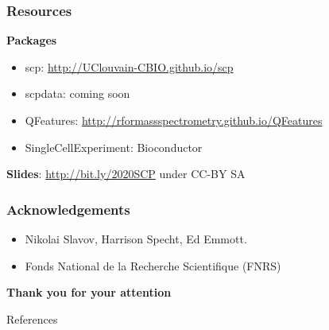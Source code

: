 \documentclass{beamer}
\newcommand{\hcode}[2][lgray]{{\ttfamily\color{vdgray}\colorbox{#1}{#2}}}
\newcommand{\frametitlesection}[1]{\frametitle{\centering #1 \footnotesize \hspace{0pt plus 1 filll} \insertsection}}
\begin{document}
\begin{frame}
    \frametitlesection{Resources}

    \textbf{Packages}

    \begin{itemize}
        \item \hcode{scp}: \url{http://UClouvain-CBIO.github.io/scp}
        \item \hcode{scpdata}: coming soon
        \item \hcode{QFeatures}: \url{http://rformassspectrometry.github.io/QFeatures}
        \item \hcode{SingleCellExperiment}: Bioconductor
    \end{itemize}


    \bigskip

    \textbf{Slides}: \url{http://bit.ly/2020SCP} under CC-BY SA

\end{frame}

\begin{frame}
    \frametitlesection{Acknowledgements}

    \begin{itemize}
    \item Nikolai Slavov, Harrison Specht, Ed Emmott.
    \item Fonds National de la Recherche Scientifique (FNRS)
    \end{itemize}

    \bigskip

    \textbf{Thank you for your attention}
    
    
\end{frame}




\begin{frame}[allowframebreaks]{References}
  \scriptsize
  
  
\end{frame}
\end{document}
